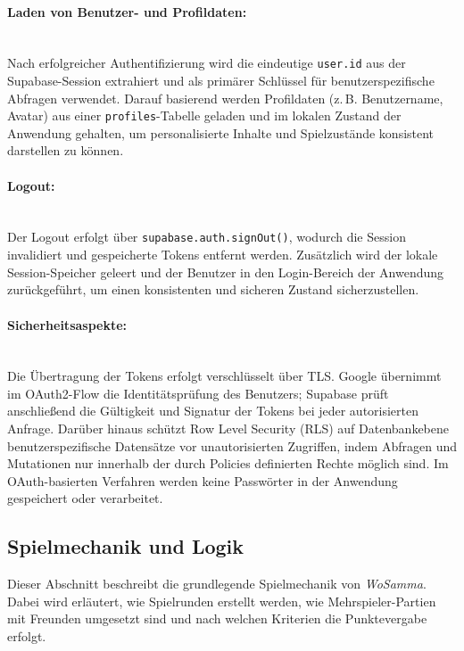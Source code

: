 \paragraph{Laden von Benutzer- und Profildaten: }
\mbox{}\\
Nach erfolgreicher Authentifizierung wird die eindeutige \texttt{user.id} aus der Supabase-Session extrahiert und als primärer Schlüssel für benutzerspezifische Abfragen verwendet. 
Darauf basierend werden Profildaten (z.\,B. Benutzername, Avatar) aus einer \texttt{profiles}-Tabelle geladen und im lokalen Zustand der Anwendung gehalten, um personalisierte Inhalte und Spielzustände konsistent darstellen zu können.

\paragraph{Logout: }
\mbox{}\\
Der Logout erfolgt über \texttt{supabase.auth.signOut()}, wodurch die Session invalidiert und gespeicherte Tokens entfernt werden. 
Zusätzlich wird der lokale Session-Speicher geleert und der Benutzer in den Login-Bereich der Anwendung zurückgeführt, um einen konsistenten und sicheren Zustand sicherzustellen.

\paragraph{Sicherheitsaspekte: }
\mbox{}\\
Die Übertragung der Tokens erfolgt verschlüsselt über TLS. 
Google übernimmt im OAuth2-Flow die Identitätsprüfung des Benutzers; Supabase prüft anschließend die Gültigkeit und Signatur der Tokens bei jeder autorisierten Anfrage. 
Darüber hinaus schützt Row Level Security (RLS) auf Datenbankebene benutzerspezifische Datensätze vor unautorisierten Zugriffen, indem Abfragen und Mutationen nur innerhalb der durch Policies definierten Rechte möglich sind. 
Im OAuth-basierten Verfahren werden keine Passwörter in der Anwendung gespeichert oder verarbeitet.

\subsection{Spielmechanik und Logik}
Dieser Abschnitt beschreibt die grundlegende Spielmechanik von \textit{WoSamma}.
Dabei wird erläutert, wie Spielrunden erstellt werden, wie Mehrspieler-Partien
mit Freunden umgesetzt sind und nach welchen Kriterien die Punktevergabe erfolgt.

